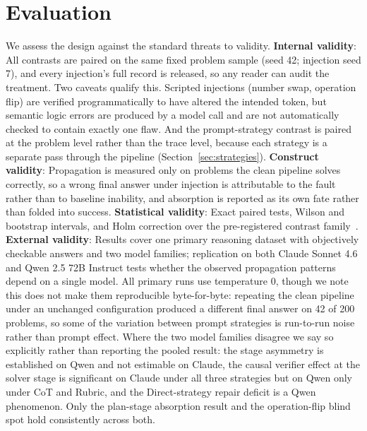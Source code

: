 \documentclass[11pt]{article}
\begin{document}
\section{Evaluation}
We assess the design against the standard threats to validity. \newline
\textbf{Internal validity}: All contrasts are paired on the same fixed problem
sample (seed 42; injection seed 7), and every injection's full record is released, so any
reader can audit the treatment. Two caveats qualify this. Scripted injections
(number swap, operation flip) are verified programmatically to have altered the
intended token, but semantic logic errors are produced by a model call and are not
automatically checked to contain exactly one flaw. And the prompt-strategy contrast is
paired at the problem level rather than the trace level, because each strategy is a
separate pass through the pipeline (Section~\ref{sec:strategies}). \newline \textbf{Construct validity}:
Propagation is measured only on problems the clean pipeline solves
correctly, so a wrong final answer under injection is attributable to the
fault rather than to baseline inability, and absorption is reported as its
own fate rather than folded into success. \newline \textbf{Statistical validity}: Exact
paired tests, Wilson and bootstrap intervals, and Holm correction over the
pre-registered contrast family~\citep{dror2018hitchhiker}. \newline \textbf{External
validity}: Results cover one primary reasoning dataset with objectively
checkable answers and two model families; replication on both Claude Sonnet
4.6 and Qwen 2.5 72B Instruct tests whether the observed propagation
patterns depend on a single model. \newline All primary runs use temperature 0, though we
note this does not make them reproducible byte-for-byte: repeating the clean pipeline under
an unchanged configuration produced a different final answer on 42 of 200 problems, so some
of the variation between prompt strategies is run-to-run noise rather than prompt effect.
Where the two model families disagree we say so explicitly rather than reporting the pooled
result: the stage asymmetry is established on Qwen and not estimable on Claude, the causal
verifier effect at the solver stage is significant on Claude under all three strategies but
on Qwen only under CoT and Rubric, and the Direct-strategy repair deficit is a Qwen
phenomenon. Only the plan-stage absorption result and the operation-flip blind spot hold
consistently across both.
\end{document}

